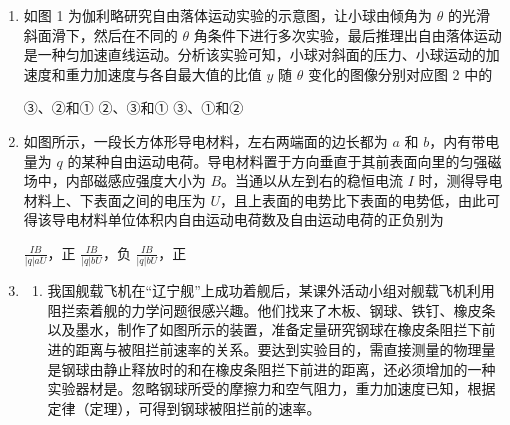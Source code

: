 \documentclass[\gkver]{gaokaozhenti}
\begin{document}
\begin{enumerate}

\item
如图 1 为伽利略研究自由落体运动实验的示意图，让小球由倾角为 $\theta$ 的光滑斜面滑下，然后在不同的 $\theta$ 角条件下进行多次实验，最后推理出自由落体运动是一种匀加速直线运动。分析该实验可知，小球对斜面的压力、小球运动的加速度和重力加速度与各自最大值的比值 $y$ 随 $\theta$ 变化的图像分别对应图 2 中的


{③、②和①}
{②、③和①}
{③、①和②}


\item
如图所示，一段长方体形导电材料，左右两端面的边长都为 $a$ 和 $b$，内有带电量为 $q$ 的某种自由运动电荷。导电材料置于方向垂直于其前表面向里的匀强磁场中，内部磁感应强度大小为 $B$。当通以从左到右的稳恒电流 $I$ 时，测得导电材料上、下表面之间的电压为 $U$，且上表面的电势比下表面的电势低，由此可得该导电材料单位体积内自由运动电荷数及自由运动电荷的正负别为


{$\frac{IB}{|q|aU}$，正}
{$\frac{IB}{|q|bU}$，负}
{$\frac{IB}{|q|bU}$，正}


\item
\begin{enumerate}
	\item
	我国舰载飞机在“辽宁舰”上成功着舰后，某课外活动小组对舰载飞机利用阻拦索着舰的力学问题很感兴趣。他们找来了木板、钢球、铁钉、橡皮条以及墨水，制作了如图所示的装置，准备定量研究钢球在橡皮条阻拦下前进的距离与被阻拦前速率的关系。要达到实验目的，需直接测量的物理量是钢球由静止释放时的和在橡皮条阻拦下前进的距离，还必须增加的一种实验器材是。忽略钢球所受的摩擦力和空气阻力，重力加速度已知，根据定律（定理），可得到钢球被阻拦前的速率。


\end{enumerate}
\end{enumerate}
\end{document}
